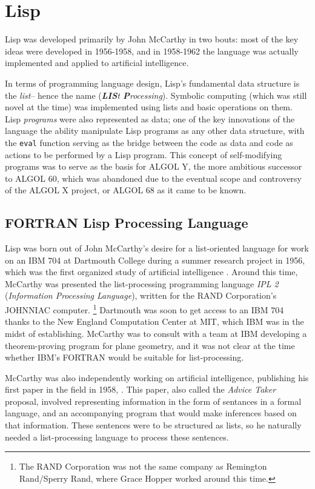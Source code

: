 \section{Lisp}

Lisp was developed primarily by John McCarthy in two bouts:
most of the key ideas were developed in 1956-1958,
and in 1958-1962 the language was actually implemented and applied to artificial
intelligence.

In terms of programming language design, Lisp's fundamental data structure is the \textit{list}--
hence the name (\textit{\textbf{LIS}t \textbf{P}rocessing}).
Symbolic computing (which was still novel at the time) was implemented using lists and basic
operations on them.
Lisp \textit{programs} were also represented as data; one of the key innovations of the language
the ability manipulate Lisp programs as any other data structure, with the \texttt{eval}
function serving as the bridge between the code as data and code as actions to be performed
by a Lisp program.
This concept of self-modifying programs was to serve as the basis for ALGOL Y,
the more ambitious successor to ALGOL 60,
which was abandoned due to the eventual scope and controversy of the ALGOL X project,
or ALGOL 68 as it came to be known.

\subsection{FORTRAN Lisp Processing Language}

Lisp was born out of John McCarthy's desire for a list-oriented language
for work on an IBM 704 at Dartmouth College during a summer research project
in 1956, which was the first organized study of artificial intelligence
\cite{mccarthy_history_of_lisp_1978}.
Around this time, McCarthy was presented the list-processing programming language \textit{IPL 2}
(\textit{Information Processing Language}), written for the RAND Corporation's JOHNNIAC computer.
\footnote{The RAND Corporation was not the same company as Remington Rand/Sperry Rand, where Grace Hopper worked around this time.}
Dartmouth was soon to get access to an IBM 704 thanks to the New England Computation Center
at MIT, which IBM was in the midst of establishing.
McCarthy was to consult with a team at IBM developing a theorem-proving program for plane geometry,
and it was not clear at the time whether IBM's FORTRAN would be suitable for list-processing.

McCarthy was also independently working on artificial intelligence,
publishing his first paper in the field in 1958,
.
This paper, also called the \textit{Advice Taker} proposal,
involved representing information in the form of sentances in a formal language,
and an accompanying program that would make inferences based on that information.
These sentences were to be structured as lists, so he naturally
needed a list-processing language to process these sentences.

